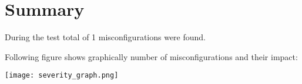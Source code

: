 \section{Summary}
During the test total of 1 misconfigurations were found.
                    
                    Following figure shows graphically number of misconfigurations and their impact:
                    

                    \texttt{[image: severity\_graph.png]}
